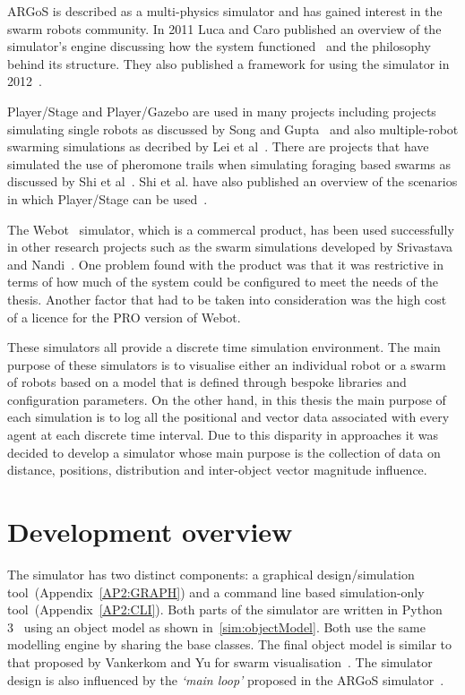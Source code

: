 ARGoS is described as a multi-physics simulator and has gained interest in the swarm robots community. In 2011 Luca and Caro published an overview of the simulator's engine discussing how the system functioned~\cite{PTOPB:11} and the philosophy behind its structure. They also published a framework for using the simulator in 2012~\cite{KCGD:12}. 

Player/Stage and Player/Gazebo are used in many projects including projects simulating single robots as discussed by Song and Gupta~\cite{SG:15} and also multiple-robot swarming simulations as decribed by Lei et al~\cite{LLZ:08}. There are projects that have simulated the use of pheromone trails when simulating foraging based swarms as discussed by Shi et al~\cite{STZZW:13}. Shi et al. have also published an overview of the scenarios in which Player/Stage can be used~\cite{STWZZ:11}.

The Webot~\cite{CL:16} simulator, which is a commercal product, has been used successfully in other research projects such as the swarm simulations developed by Srivastava and Nandi~\cite{SN:10}. One problem found with the product was that it was restrictive in terms of how much of the system could be configured to meet the needs of the thesis. Another factor that had to be taken into consideration was the high cost of a licence for the PRO version of Webot.

These simulators all provide a discrete time simulation environment. The main purpose of these simulators is to visualise either an individual robot or a swarm of robots based on a model that is defined through bespoke libraries and configuration parameters. On the other hand, in this thesis the main purpose of each simulation is to log all the positional and vector data associated with every agent at each discrete time interval. Due to this disparity in approaches it was decided to develop a simulator whose main purpose is the collection of data on distance, positions, distribution and inter-object vector magnitude influence. 

\section{Development overview}\label{sim:intro}
The simulator has two distinct components: a graphical design/simulation tool~(Appendix~\autoref{AP2:GRAPH}) and a command line based simulation-only tool~(Appendix~\autoref{AP2:CLI}). Both parts of the simulator are written in Python 3~\cite{PYTHON3:15} using an object model as shown in~\autoref{sim:objectModel}. Both use the same modelling engine by sharing the base classes.  The final object model is similar to that proposed by Vankerkom and Yu for swarm visualisation~\cite{VY:04}. The simulator design is also influenced by the \textit{`main loop'} proposed in the ARGoS simulator~\cite{PTOPB:11}.

